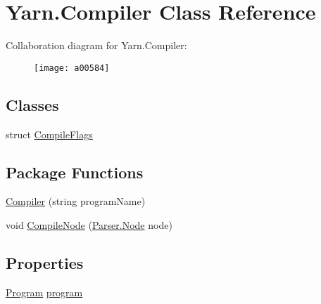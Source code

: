 \hypertarget{a00044}{\section{Yarn.\-Compiler Class Reference}
\label{a00044}
}


Collaboration diagram for Yarn.\-Compiler\-:
\nopagebreak
\begin{figure}[H]
\begin{center}
\leavevmode
\texttt{[image: a00584]}
\end{center}
\end{figure}
\subsection*{Classes}
\begin{DoxyCompactItemize}
\item 
struct \hyperlink{a00044_a00357}{Compile\-Flags}
\end{DoxyCompactItemize}
\subsection*{Package Functions}
\begin{DoxyCompactItemize}
\item 
\hyperlink{a00044_a47bfde319a618a1e11d00cb282a84364}{Compiler} (string program\-Name)
\item 
void \hyperlink{a00044_a10b52c5694f78285d087a455e3654eaa}{Compile\-Node} (\hyperlink{a00128}{Parser.\-Node} node)
\end{DoxyCompactItemize}
\subsection*{Properties}
\begin{DoxyCompactItemize}
\item 
\hyperlink{a00142}{Program} \hyperlink{a00044_aa1737da428ec7d597009661dd8a47829}{program}
\end{DoxyCompactItemize}
